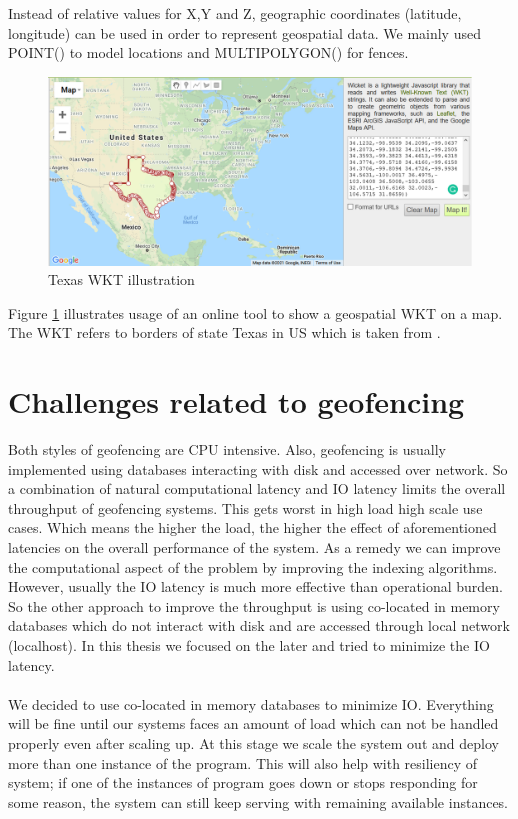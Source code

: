 \documentclass[a4]{report}
\begin{document}
    Instead of relative values for X,Y and Z, geographic coordinates (latitude, longitude) can be used in order to
    represent geospatial data.
    We mainly used POINT() to model locations and MULTIPOLYGON() for fences.

    \begin{figure}[ht]
        \centering
        \caption{Texas WKT illustration}
        \label{fig:texas}
        \includegraphics[width=\linewidth, scale=0.5]{images/texas.png}
    \end{figure}
    Figure \ref{fig:texas} illustrates usage of an online tool \cite{WKTtool} to show a geospatial WKT on a map.
    The WKT refers to borders of state Texas in US which is taken from \cite{WKTs}.


    \section{Challenges related to geofencing}
    Both styles of geofencing are CPU intensive.
    Also, geofencing is usually implemented using databases interacting with disk and accessed over network.
    So a combination of natural computational latency and IO latency limits the overall throughput of geofencing systems.
    This gets worst in high load high scale use cases.
    Which means the higher the load, the higher the effect of aforementioned latencies on the overall performance
    of the system.
    As a remedy we can improve the computational aspect of the problem by improving the indexing algorithms.
    However, usually the IO latency is much more effective than operational burden.
    So the other approach to improve the throughput is using co-located in memory databases which do not interact
    with disk and are accessed through local network (localhost).
    In this thesis we focused on the later and tried to minimize the IO latency.

    \paragraph{}
    We decided to use co-located in memory databases to minimize IO.
    Everything will be fine until our systems faces an amount of load which can not be handled properly even after scaling up.
    At this stage we scale the system out and deploy more than one instance of the program.
    This will also help with resiliency of system;
    if one of the instances of program goes down or stops responding for some reason, the system can still keep
    serving with remaining available instances.
\end{document}
